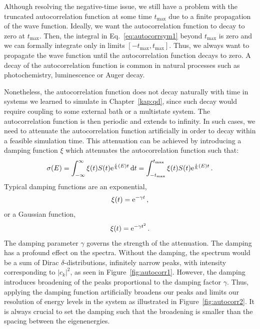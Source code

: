 Although resolving the negative-time issue, we still have a problem with the truncated autocorrelation function at some time $t_\mathrm{max}$ due to a finite propagation of the wave function. Ideally, we want the autocorrelation function to decay to zero at $t_\mathrm{max}$. Then, the integral in Eq.~\eqref{eq:autocorrsym1} beyond $t_\mathrm{max}$ is zero and we can formally integrate only in limits $[-t_\mathrm{max}, t_\mathrm{max}]$. Thus, we always want to propagate the wave function until the autocorrelation function decays to zero. A decay of the autocorrelation function is common in natural processes such as photochemistry, luminescence or Auger decay. 

Nonetheless, the autocorrelation function does not decay naturally with time in systems we learned to simulate in Chapter~\ref{kap:qd}, since such decay would require coupling to some external bath or a multistate system. The autocorrelation function is then periodic and extends to infinity. In such cases, we need to attenuate the autocorrelation function artificially in order to decay within a feasible simulation time. This attenuation can be achieved by introducing a damping function $\xi$ which attenuates the autocorrelation function such that:
\begin{equation}
    \sigma(E) = \int_{-\infty}^{\infty} \xi(t) S(t) \mathrm{e}^{\frac{i}{\hbar}(E)t}  \mathop{}\!\mathrm{d} t =  \int_{-t_\mathrm{max}}^{t_\mathrm{max}} \xi(t) S(t) \mathrm{e}^{\frac{i}{\hbar}(E)t}\, .
    \label{eq:damping1}
\end{equation}
Typical damping functions are an exponential, 
\begin{equation}
    \xi(t) = \mathrm{e}^{-\gamma t} \, ,
\end{equation}
or a  Gaussian function,
\begin{equation}
    \xi(t) = \mathrm{e}^{-\gamma t^2} \, .
    \label{eq:gaussdamping}
\end{equation}
The damping parameter $\gamma$ governs the strength of the attenuation. The damping has a profound effect on the spectra. Without the damping, the spectrum would be a sum of Dirac $\delta$-distributions, infinitely narrow peaks, with intensity corresponding to $|c_k|^2$, as seen in Figure~\ref{fig:autocorr1}. However, the damping introduces broadening of the peaks proportional to the damping factor $\gamma$. Thus, applying the damping function artificially broadens our peaks and limits our resolution of energy levels in the system as illustrated in Figure~\ref{fig:autocorr2}. It is always crucial to set the damping such that the broadening is smaller than the spacing between the eigenenergies.

